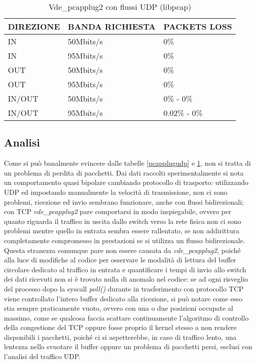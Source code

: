\begin{table}[h]
\begin{tabular}{|p{}|p{}|p{}|}
\hline
DIREZIONE    & BANDA RICHIESTA   &  PACKETS LOSS   \\
\hline
\hline
IN       & 50Mbits/s  &  0\%   \\
\hline
IN       & 95Mbits/s  &  0\%   \\
\hline
OUT      & 50Mbits/s  &  0\%  \\
\hline
OUT      & 95Mbits/s  &  0\%  \\
\hline
IN/OUT   & 50Mbits/s  &  0\% - 0\%   \\
\hline
IN/OUT   & 95Mbits/s  &  0.02\% - 0\%   \\
\hline
\end{tabular}
\caption{Vde\_pcapplug2 con flussi UDP (libpcap)}
\label{pcapplugudpx}
\end{table}
\subsection{Analisi}
Come si può banalmente evincere dalle tabelle {\ref{pcapplugudp}} e {\ref{pcapplugudpx}}, non si tratta di un problema di perdita di pacchetti. Dai dati raccolti sperimentalmente si nota un comportamento quasi bipolare cambiando protocollo di trasporto: utilizzando UDP ed impostando manualmente la velocità di trasmissione, non ci sono problemi, ricezione ed invio sembrano funzionare, anche con flussi bidirezionali; con TCP {\em vde\_pcapplug2} pare comportarsi in modo inspiegabile, ovvero per quanto riguarda il traffico in uscita dallo switch verso la rete fisica non ci sono problemi mentre quello in entrata sembra essere rallentato, se non addirittura completamente compromesso in prestazioni se si utilizza un flusso bidirezionale. Questa stranezza comunque pare non essere causata da {\em vde\_pcapplug2}, poiché alla luce di modifiche al codice per osservare le modalità di lettura del buffer circolare dedicato al traffico in entrata e quantificare i tempi di invio allo switch dei dati ricevuti non si è trovato nulla di anomalo nel codice: se ad ogni risveglio del processo dopo la syscall {\em poll()} durante in trasferimento con protocollo TCP viene controllato l'intero buffer dedicato alla ricezione, si può notare come esso stia sempre praticamente vuoto, ovvero con una o due posizioni occupate al massimo, come se qualcosa faccia scattare continuamente l'algoritmo di controllo della congestione del TCP oppure fosse proprio il kernel stesso a non rendere disponibili i pacchetti, poiché ci si aspetterebbe, in caso di traffico lento, una lentezza nello svuotare il buffer oppure un problema di pacchetti persi, esclusi con l'analisi del traffico UDP.
